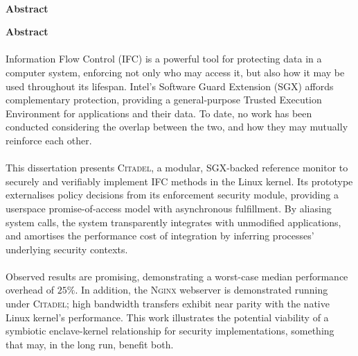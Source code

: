 \newpage

\ifblind 

\begin{center}
    \vspace*{1mm}
    \noindent
    \huge
    \dissertationtitle \\
    \vspace{18pt} 
    {\large \bf \sc Abstract}
    \vspace{12pt} 
\end{center}

\else
{\Huge \bf Abstract}
\vspace{24pt} 
\fi


\paragraph{} Information Flow Control (IFC) is a powerful tool for protecting data in a computer system, enforcing not only who may access it, but also how it may be used throughout its lifespan. Intel's Software Guard Extension (SGX) affords complementary protection, providing a general-purpose Trusted Execution Environment for applications and their data. To date, no work has been conducted considering the overlap between the two, and how they may mutually reinforce each other.

\paragraph{} This dissertation presents \textsc{Citadel}, a modular, SGX-backed reference monitor to securely and verifiably implement IFC methods in the Linux kernel. Its prototype externalises policy decisions from its enforcement security module, providing a userspace promise-of-access model with asynchronous fulfillment. By aliasing system calls, the system transparently integrates with unmodified applications, and amortises the performance cost of integration by inferring processes' underlying security contexts.

\paragraph{} Observed results are promising, demonstrating a worst-case median performance overhead of $25\%$. In addition, the \textsc{Nginx} webserver is demonstrated running under \textsc{Citadel}; high bandwidth transfers exhibit near parity with the native Linux kernel's performance. This work illustrates the potential viability of a symbiotic enclave-kernel relationship for security implementations, something that may, in the long run, benefit both.



\newpage

\vspace*{\fill}
